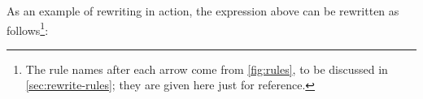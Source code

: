 \documentclass[acmsmall]{acmart}
\begin{document}
As an example of rewriting in action, the expression above can be rewritten
as follows\footnote{The rule names after each arrow come from \cref{fig:rules}, to be discussed in \cref{sec:rewrite-rules}; they
  are given here just for reference.}:
\end{document}
